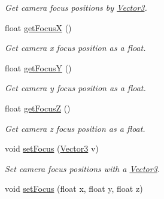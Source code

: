 \begin{DoxyCompactItemize}
\begin{DoxyCompactList}\small\item\em Get camera focus positions by \hyperlink{struct_vector3}{Vector3}. \end{DoxyCompactList}\item 
\hypertarget{class_camera_a95069ab8c46776a4c63e65a436ee0c03}{float \hyperlink{class_camera_a95069ab8c46776a4c63e65a436ee0c03}{get\-Focus\-X} ()}\label{class_camera_a95069ab8c46776a4c63e65a436ee0c03}

\begin{DoxyCompactList}\small\item\em Get camera x focus position as a float. \end{DoxyCompactList}\item 
\hypertarget{class_camera_a54d046e2a6fbd638ff744b5fb8099ff3}{float \hyperlink{class_camera_a54d046e2a6fbd638ff744b5fb8099ff3}{get\-Focus\-Y} ()}\label{class_camera_a54d046e2a6fbd638ff744b5fb8099ff3}

\begin{DoxyCompactList}\small\item\em Get camera y focus position as a float. \end{DoxyCompactList}\item 
\hypertarget{class_camera_a6e7f36a5bd302adaf7e0671015fcd8f3}{float \hyperlink{class_camera_a6e7f36a5bd302adaf7e0671015fcd8f3}{get\-Focus\-Z} ()}\label{class_camera_a6e7f36a5bd302adaf7e0671015fcd8f3}

\begin{DoxyCompactList}\small\item\em Get camera z focus position as a float. \end{DoxyCompactList}\item 
\hypertarget{class_camera_a887dffb42dc92061221920a0a4087cb8}{void \hyperlink{class_camera_a887dffb42dc92061221920a0a4087cb8}{set\-Focus} (\hyperlink{struct_vector3}{Vector3} v)}\label{class_camera_a887dffb42dc92061221920a0a4087cb8}

\begin{DoxyCompactList}\small\item\em Set camera focus positions with a \hyperlink{struct_vector3}{Vector3}. \end{DoxyCompactList}\item 
\hypertarget{class_camera_a9b776c8967d097ce693ed6729d7d18eb}{void \hyperlink{class_camera_a9b776c8967d097ce693ed6729d7d18eb}{set\-Focus} (float x, float y, float z)}\label{class_camera_a9b776c8967d097ce693ed6729d7d18eb}


\end{DoxyCompactItemize}
